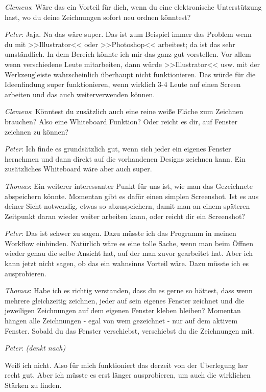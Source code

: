\medskip \emph{Clemens}: Wäre das ein Vorteil für dich, wenn du eine elektronische Unterstützung hast, wo du deine Zeichnungen sofort neu ordnen könntest?

\medskip \emph{Peter}: Jaja. Na das wäre super. Das ist zum Beispiel immer das Problem wenn du mit >>Illustrator<< oder >>Photoshop<< arbeitest; da ist das sehr umständlich. In dem Bereich könnte ich mir das ganz gut vorstellen. Vor allem wenn verschiedene Leute mitarbeiten, dann würde >>Illustrator<< usw. mit der Werkzeugleiste wahrscheinlich überhaupt nicht funktionieren. Das würde für die Ideenfindung super funktionieren, wenn wirklich 3-4 Leute auf einen Screen arbeiten und das auch weiterverwenden können.

\medskip \emph{Clemens}: Könntest du zusätzlich auch eine reine weiße Fläche zum Zeichnen brauchen? Also eine Whiteboard Funktion? Oder reicht es dir, auf Fenster zeichnen zu können?

\medskip \emph{Peter}: Ich finde es grundsätzlich gut, wenn sich jeder ein eigenes Fenster hernehmen und dann direkt auf die vorhandenen Designs zeichnen kann. Ein zusätzliches Whiteboard wäre aber auch super.

\medskip \emph{Thomas}: Ein weiterer interessanter Punkt für uns ist, wie man das Gezeichnete abspeichern könnte. Momentan gibt es dafür einen simplen Screenshot. Ist es aus deiner Sicht notwendig, etwas so abzuspeichern, damit man an einem späteren Zeitpunkt daran wieder weiter arbeiten kann, oder reicht dir ein Screenshot?

\medskip \emph{Peter}: Das ist schwer zu sagen. Dazu müsste ich das Programm in meinen Workflow einbinden. Natürlich wäre es eine tolle Sache, wenn man beim Öffnen wieder genau die selbe Ansicht hat, auf der man zuvor gearbeitet hat. Aber ich kann jetzt nicht sagen, ob das ein wahnsinns Vorteil wäre. Dazu müsste ich es ausprobieren.

\medskip \emph{Thomas}: Habe ich es richtig verstanden, dass du es gerne so hättest, dass wenn mehrere gleichzeitig zeichnen, jeder auf sein eigenes Fenster zeichnet und die jeweiligen Zeichnungen auf dem eigenen Fenster kleben bleiben? Momentan hängen alle Zeichnungen - egal von wem gezeichnet - nur auf dem aktivem Fenster. Sobald du das Fenster verschiebst, verschiebst du die Zeichnungen mit.

\medskip \emph{Peter}: \emph{(denkt nach)} 

\smallskip Weiß ich nicht. Also für mich funktioniert das derzeit von der Überlegung her recht gut. Aber ich müsste es erst länger ausprobieren, um auch die wirklichen Stärken zu finden.

